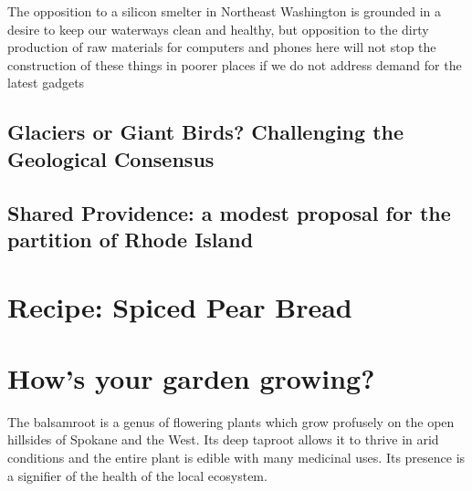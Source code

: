 \documentclass[10pt,a6paper,footinclude=false,firstfoot=false,headinclude=true,open=any,DIV=6]{scrbook} %
\begin{document}
The opposition to a silicon smelter in Northeast Washington is grounded in a desire to keep our waterways clean and healthy, but opposition to the dirty production of raw materials for computers and phones here will not stop the construction of these things in poorer places if we do not address demand for the latest gadgets \ellipsis

\section*{Glaciers or Giant Birds? Challenging the Geological Consensus}

\section*{Shared Providence: a modest proposal for the partition of Rhode Island}









\chapter{Recipe: Spiced Pear Bread}


\chapter{How's your garden growing?}


\newpage
\thispagestyle{empty}

\begin{center}
\begin{minipage}{0.6\textwidth}

\vspace{1em}
\noindent The balsamroot is a genus of flowering plants which grow profusely on the open hillsides of Spokane and the West. Its deep taproot allows it to thrive in arid conditions and the entire plant is edible with many medicinal uses. Its presence is a signifier of the health of the local ecosystem.
\end{minipage}
\end{center}
\end{document}
